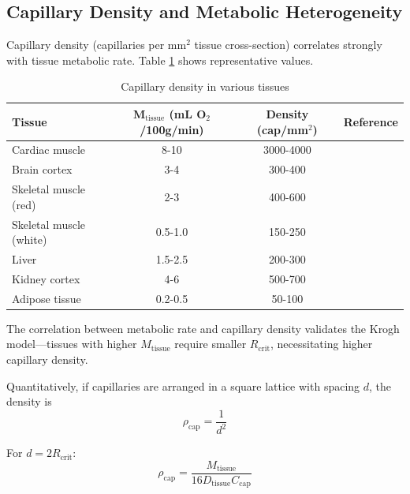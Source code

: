 \documentclass[12pt,a4paper]{article}
\theoremstyle{remark}
\begin{document}
\subsection{Capillary Density and Metabolic Heterogeneity}

Capillary density (capillaries per mm$^{2}$ tissue cross-section) correlates strongly with tissue metabolic rate. Table \ref{tab:capillary_density} shows representative values.

\begin{table}[h]
\centering
\caption{Capillary density in various tissues}
\label{tab:capillary_density}
\begin{tabular}{lccc}
\toprule
\textbf{Tissue} & \textbf{$\boldsymbol{M_{\mathrm{tissue}}}$ (mL O$_{2}$/100g/min)} & \textbf{Density (cap/mm$^{2}$)} & \textbf{Reference} \\
\midrule
Cardiac muscle & 8-10 & 3000-4000 & \cite{rakusan1971quantitative} \\
Brain cortex & 3-4 & 300-400 & \cite{pawlik1981quantitative} \\
Skeletal muscle (red) & 2-3 & 400-600 & \cite{hudlicka1992muscle} \\
Skeletal muscle (white) & 0.5-1.0 & 150-250 & \cite{hudlicka1992muscle} \\
Liver & 1.5-2.5 & 200-300 & \cite{rappaport1973hepatic} \\
Kidney cortex & 4-6 & 500-700 & \cite{beeuwkes1975renal} \\
Adipose tissue & 0.2-0.5 & 50-100 & \cite{crandall1997microvascular} \\
\bottomrule
\end{tabular}
\end{table}

The correlation between metabolic rate and capillary density validates the Krogh model—tissues with higher $M_{\mathrm{tissue}}$ require smaller $R_{\mathrm{crit}}$, necessitating higher capillary density.

Quantitatively, if capillaries are arranged in a square lattice with spacing $d$, the density is
\begin{equation}
\rho_{\mathrm{cap}} = \frac{1}{d^{2}}
\end{equation}

For $d = 2R_{\mathrm{crit}}$:
\begin{equation}
\rho_{\mathrm{cap}} = \frac{M_{\mathrm{tissue}}}{16D_{\mathrm{tissue}} C_{\mathrm{cap}}}
\end{equation}
\end{document}
